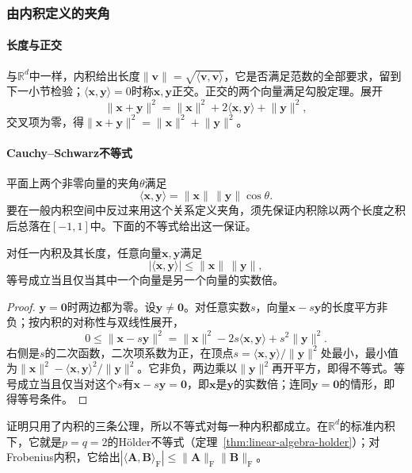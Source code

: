 \subsubsection{由内积定义的夹角}
\label{sec:ls-inner-product-angle}

\paragraph{长度与正交}
与$\mathbb R^d$中一样，内积给出长度$\lVert\bm v\rVert=\sqrt{\langle\bm v,\bm v\rangle}$，它是否满足范数的全部要求，留到下一小节检验；$\langle\bm x,\bm y\rangle=0$时称$\bm x,\bm y$正交。正交的两个向量满足勾股定理。展开
\[
 \lVert\bm x+\bm y\rVert^2=\lVert\bm x\rVert^2+2\langle\bm x,\bm y\rangle+\lVert\bm y\rVert^2,
\]
交叉项为零，得$\lVert\bm x+\bm y\rVert^2=\lVert\bm x\rVert^2+\lVert\bm y\rVert^2$。

\paragraph{Cauchy--Schwarz不等式}
平面上两个非零向量的夹角$\theta$满足
\[
 \langle\bm x,\bm y\rangle=\lVert\bm x\rVert\,\lVert\bm y\rVert\cos\theta.
\]
要在一般内积空间中反过来用这个关系定义夹角，须先保证内积除以两个长度之积后总落在$[-1,1]$中。下面的不等式给出这一保证。
\begin{theorem}
\label{thm:linear-algebra-cauchy-schwarz}
对任一内积及其长度，任意向量$\bm x,\bm y$满足
\begin{equation}
 |\langle\bm x,\bm y\rangle|\leq\lVert\bm x\rVert\,\lVert\bm y\rVert,
 \label{eq:prelim-cauchy-schwarz}
\end{equation}
等号成立当且仅当其中一个向量是另一个向量的实数倍。
\end{theorem}
\begin{proof}
$\bm y=\bm0$时两边都为零。设$\bm y\neq\bm0$。对任意实数$s$，向量$\bm x-s\bm y$的长度平方非负；按内积的对称性与双线性展开，
\[
 0\leq\lVert\bm x-s\bm y\rVert^2
 =\lVert\bm x\rVert^2-2s\langle\bm x,\bm y\rangle+s^2\lVert\bm y\rVert^2.
\]
右侧是$s$的二次函数，二次项系数为正，在顶点$s=\langle\bm x,\bm y\rangle/\lVert\bm y\rVert^2$处最小，最小值为$\lVert\bm x\rVert^2-\langle\bm x,\bm y\rangle^2/\lVert\bm y\rVert^2$。它非负，两边乘以$\lVert\bm y\rVert^2$再开平方，即得不等式。等号成立当且仅当对这个$s$有$\bm x-s\bm y=\bm0$，即$\bm x$是$\bm y$的实数倍；连同$\bm y=\bm0$的情形，即得等号条件。
\end{proof}
证明只用了内积的三条公理，所以不等式对每一种内积都成立。在$\mathbb R^d$的标准内积下，它就是$p=q=2$的Hölder不等式（定理~\ref{thm:linear-algebra-holder}）；对Frobenius内积，它给出$|\langle\bm A,\bm B\rangle_{\mathrm F}|\leq\lVert\bm A\rVert_{\mathrm F}\lVert\bm B\rVert_{\mathrm F}$。


